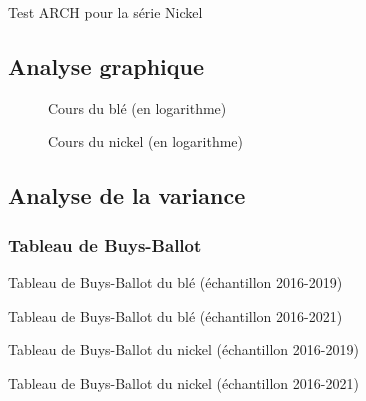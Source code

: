 \documentclass[12pt,a4paper]{article}
\begin{document}
\begin{table}[H]
    \centering
    \caption{Test ARCH pour la série Nickel}
    \sffamily
    \label{tab:hetero_nickel}
    
\end{table}

\subsection{Analyse graphique}\label{appendix:loggraph}
\begin{figure}[H]
    \centering
    \label{fig:ble_log}
    \resizebox{0.8\textwidth}{!}{}
    \caption{Cours du blé (en logarithme)}
\end{figure}
\begin{figure}[H]
    \centering
    \label{fig:nickel_log}
    \resizebox{0.8\textwidth}{!}{}
    \caption{Cours du nickel (en logarithme)}
\end{figure}
\subsection{Analyse de la variance}
\subsubsection{Tableau de Buys-Ballot}\label{appendix:bb}
\begin{table}[H]
    \sffamily
    \centering
    \label{tab:bb_ble19}
    \resizebox{\textwidth}{!}{}
    \caption{Tableau de Buys-Ballot du blé (échantillon 2016-2019) }
\end{table}
\begin{table}[H]
    \sffamily
    \centering
    \label{tab:bb_ble21}
    \resizebox{\textwidth}{!}{}
    \caption{Tableau de Buys-Ballot du blé (échantillon 2016-2021) }
\end{table}
\begin{table}[H]
    \sffamily
    \centering
    \label{tab:bb_nickel19}
    \resizebox{\textwidth}{!}{}
    \caption{Tableau de Buys-Ballot du nickel (échantillon 2016-2019) }
\end{table}
\begin{table}[H]
    \sffamily
    \centering
    \label{tab:bb_nickel21}
    \resizebox{\textwidth}{!}{}
    \caption{Tableau de Buys-Ballot du nickel (échantillon 2016-2021) }
\end{table}
\end{document}
